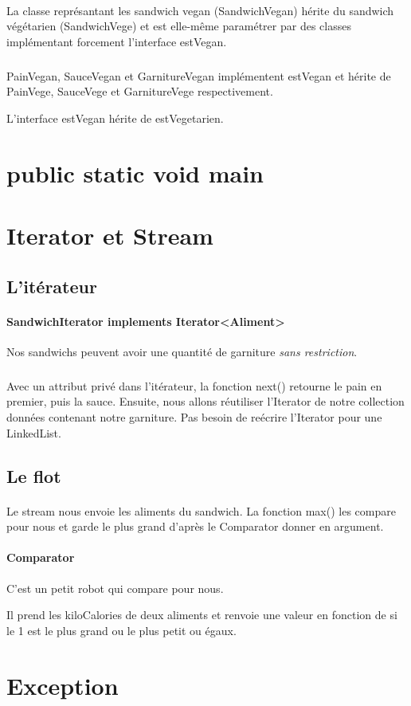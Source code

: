 \documentclass[a4paper]{article}
\begin{document}
\paragraph{}
La classe représantant les sandwich vegan (SandwichVegan) hérite du sandwich végétarien (SandwichVege) et est elle-même paramétrer par des classes implémentant forcement l'interface estVegan.
\subparagraph{}
PainVegan, SauceVegan et GarnitureVegan implémentent estVegan et hérite de PainVege, SauceVege et GarnitureVege respectivement.

L'interface estVegan hérite de estVegetarien.
\section{public static void main}

\section{Iterator et Stream}
\subsection{L'itérateur}
\paragraph{SandwichIterator implements Iterator<Aliment>}
Nos sandwichs peuvent avoir une quantité de garniture \emph{sans restriction}.

\subparagraph{}
Avec un attribut privé dans l'itérateur, la fonction next() retourne le pain en premier, puis la sauce.
Ensuite, nous allons réutiliser l'Iterator de notre collection données contenant notre garniture. Pas besoin de reécrire l'Iterator pour une LinkedList.

\subsection{Le flot}
\paragraph{}
Le stream nous envoie les aliments du sandwich. La fonction max() les compare pour nous et garde le plus grand d'après le Comparator donner en argument. 
\paragraph{Comparator}
C'est un petit robot qui compare pour nous.

Il prend les kiloCalories de deux aliments et renvoie une valeur en fonction de si le 1 est le plus grand ou le plus petit ou égaux.

\section{Exception}
\end{document}
